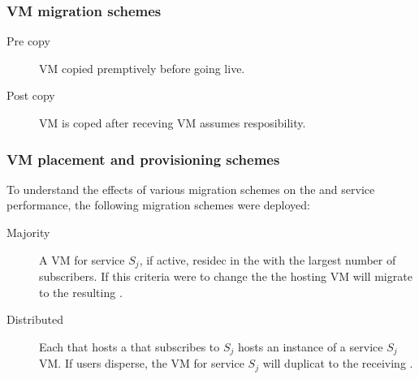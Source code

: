 \subsubsection{VM migration schemes}

\begin{description}
\item[Pre copy] VM copied premptively before going live.
\item[Post copy] VM is coped after receving VM assumes resposibility.
\end{description}

\subsubsection{VM placement and \dc{} provisioning schemes}
To understand the effects of various migration schemes on the \dc and service performance, the following migration schemes were deployed:

\begin{description}
\item[Majority] A VM for service $S_j$, if active, residec in the \dc with the largest number of subscribers. If this criteria were to change the the hosting VM will migrate to the resulting \dc.
\item[Distributed] Each \dc that hosts a \ue that subscribes to $S_j$ hosts an instance of a service $S_j$ VM. If users disperse, the VM for service $S_j$ will duplicat to the receiving \dc.
\end{description}